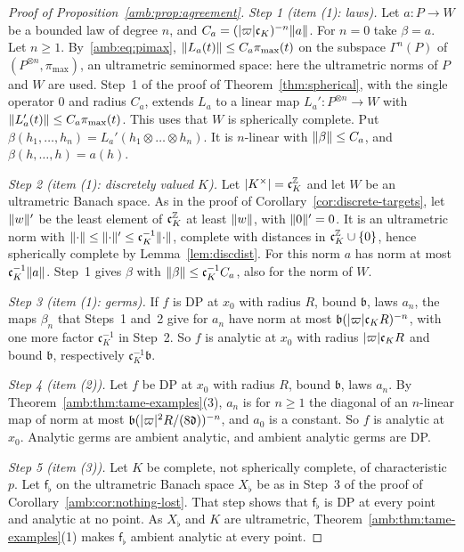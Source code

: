 \begin{proof}[Proof of Proposition~\ref{amb:prop:agreement}]
\emph{Step 1 (item (1): laws).} Let $a\colon P\to W$ be a bounded law of degree $n$, and $C_a=(\lvert \varpi\rvert\mathfrak c_K)^{-n}\lVert a\rVert$.
For $n=0$ take $\beta=a$. Let $n\ge1$. By~\eqref{amb:eq:pimax}, $\lVert L_a(t)\rVert\le C_a\pi_{\max}(t)$ on the subspace $\Gamma^n(P)$ of
$(P^{\otimes n},\pi_{\max})$, an ultrametric seminormed space: here the ultrametric norms of $P$ and $W$ are used. Step~1 of the proof
of Theorem~\ref{thm:spherical}, with the single operator $0$ and radius $C_a$, extends $L_a$ to a linear map $L_a'\colon
P^{\otimes n}\to W$ with $\lVert L_a'(t)\rVert\le C_a\pi_{\max}(t)$. This uses that $W$ is spherically complete. Put
$\beta(h_1,\dots,h_n)=L_a'(h_1\otimes\dots\otimes h_n)$. It is $n$\nobreakdash-linear with $\lVert \beta\rVert\le C_a$, and
$\beta(h,\dots,h)=a(h)$.

\emph{Step 2 (item (1): discretely valued $K$).} Let $\lvert K^\times\rvert=\mathfrak c_K^{\mathbb Z}$ and let $W$ be an ultrametric Banach space.
As in the proof of Corollary~\ref{cor:discrete-targets}, let $\lVert w\rVert'$ be the least element of $\mathfrak c_K^{\mathbb Z}$ at least
$\lVert w\rVert$, with $\lVert 0\rVert'=0$. It is an ultrametric norm with $\lVert \cdot\rVert\le\lVert \cdot\rVert'\le\mathfrak c_K^{-1}\lVert \cdot\rVert$, complete with
distances in $\mathfrak c_K^{\mathbb Z}\cup\{0\}$, hence spherically complete by Lemma~\ref{lem:discdist}. For this norm $a$ has norm at
most $\mathfrak c_K^{-1}\lVert a\rVert$. Step~1 gives $\beta$ with $\lVert \beta\rVert\le\mathfrak c_K^{-1}C_a$, also for the norm of $W$.

\emph{Step 3 (item (1): germs).} If $f$ is DP at $x_0$ with radius $R$, bound $\mathfrak b$, laws $a_n$, the maps $\beta_n$ that Steps~1 and~2 give for $a_n$ have norm at most
$\mathfrak b(\lvert \varpi\rvert\mathfrak c_KR)^{-n}$, with one more factor $\mathfrak c_K^{-1}$ in Step~2. So $f$ is analytic at $x_0$ with radius
$\lvert \varpi\rvert\mathfrak c_KR$ and bound $\mathfrak b$, respectively $\mathfrak c_K^{-1}\mathfrak b$.

\emph{Step 4 (item (2)).} Let $f$ be DP at $x_0$ with radius $R$, bound $\mathfrak b$, laws $a_n$. By
Theorem~\ref{amb:thm:tame-examples}(3), $a_n$ is for $n\ge1$ the diagonal of an $n$-linear map of norm at most $\mathfrak b(\lvert \varpi\rvert^2R/(8\mathfrak d))^{-n}$, and $a_0$ is a constant. So $f$ is
analytic at $x_0$. Analytic germs are ambient analytic, and ambient analytic germs are DP.

\emph{Step 5 (item (3)).} Let $K$ be complete, not spherically complete, of characteristic $p$. Let $\mathsf f_\flat$ on the ultrametric Banach space $X_\flat$ be as in Step~3 of the proof of
Corollary~\ref{amb:cor:nothing-lost}. That step shows that $\mathsf f_\flat$ is DP at every point and analytic at no point. As $X_\flat$ and $K$ are ultrametric, Theorem~\ref{amb:thm:tame-examples}(1) makes $\mathsf f_\flat$ ambient analytic at every point.
\end{proof}
